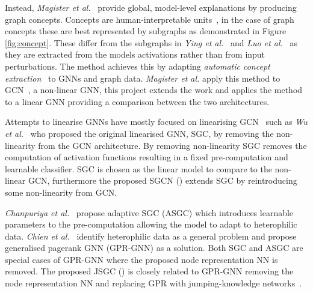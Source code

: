 Instead, \textit{Magister et al.}~\cite{magister2021gcexplainer} provide global, model-level explanations by producing graph concepts.
Concepts are human-interpretable units~\cite{ghorbani2019towards}, in the case of graph concepts these are best represented by subgraphs as demonstrated in Figure \ref{fig:concept}.
These differ from the subgraphs in \textit{Ying et al.}~\cite{ying2019gnnexplainer} and \textit{Luo et al.}~\cite{luo2020parameterized} as they are extracted from the models activations rather than from input perturbations.
The method achieves this by adapting \textit{automatic concept extraction}~\cite{ghorbani2019towards} to GNNs and graph data.
\textit{Magister et al.} apply this method to GCN~\cite{kipf2016semi}, a non-linear GNN, this project extends the work and applies the method to a linear GNN providing a comparison between the two architectures.

Attempts to linearise GNNs have mostly focused on linearising GCN~\cite{kipf2016semi} such as \textit{Wu et al.}~\cite{wu2019simplifying} who proposed the original linearised GNN, SGC, by removing the non-linearity from the GCN architecture.
By removing non-linearity SGC removes the computation of activation functions resulting in a fixed pre-computation and learnable classifier.
SGC is chosen as the linear model to compare to the non-linear GCN, furthermore the proposed SGCN () extends SGC by reintroducing some non-linearity from GCN.

\textit{Chanpuriya et al.}~\cite{chanpuriya2022simplified} propose adaptive SGC (ASGC) which introduces learnable parameters to the pre-computation allowing the model to adapt to heterophilic data.
\textit{Chien et al.}~\cite{chien2020adaptive} identify heterophilic data as a general problem and propose generalised pagerank GNN (GPR-GNN) as a solution.
Both SGC and ASGC are special cases of GPR-GNN where the proposed node representation NN is removed.
The proposed JSGC () is closely related to GPR-GNN removing the node representation NN and replacing GPR with jumping-knowledge networks~\cite{xu2018representation}.

